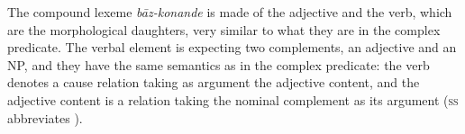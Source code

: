 {\ea
\label{GSexemple72}
\z

The compound lexeme \emph{b\=az-konande} is made of the adjective and the verb, which are the morphological daughters, very similar to what they are in the complex predicate. The verbal element is expecting two complements, an adjective and an NP, and they have the same semantics as in the complex predicate: the verb denotes a cause relation taking as argument the adjective content, and the adjective content is a relation taking the nominal complement as its argument (\textsc{ss} abbreviates \synsem). 

\begin{exe}
\end{exe}

}

